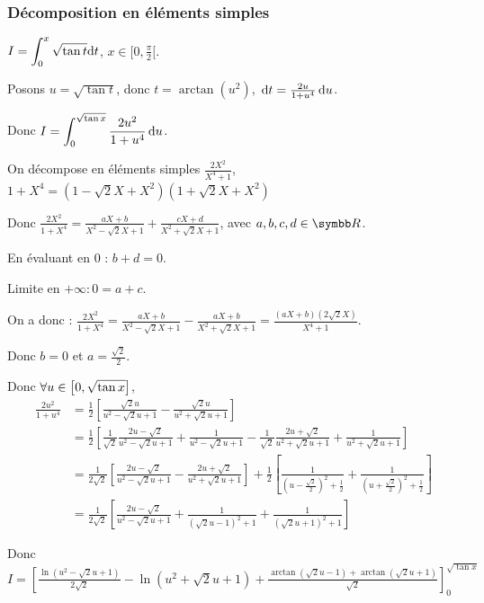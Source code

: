 \subsubsection{Décomposition en éléments simples}
\begin{exemple}
    $\displaystyle I = \int_0^x \sqrt{\tan t} \text d t$, $x \in [0, \frac \pi 2[$.

    Posons $u = \sqrt{\tan t}$, donc $t = \arctan(u^2)$, $\,\mathrm{d}t = \frac{2u}{1 + u^4} \,\mathrm{d} u$.

    Donc $\displaystyle I = \int_0^{\sqrt{\tan x}} \frac{2u^2}{1 + u^4} \,\mathrm{d} u$.

    \avspace On décompose en éléments simples $\frac{2X^2}{X^4 + 1}$,
    $1 + X^4 = (1 - \sqrt 2 X + X^2)(1 + \sqrt 2 X + X^2)$

    Donc $\displaystyle \frac{2X^2}{1 + X^4} = \frac{aX + b}{X^2 - \sqrt 2 X + 1} + \frac{cX + d}{X^2 + \sqrt 2 X + 1}$,
    avec $a,b,c,d \in \R$.

    \avspace En évaluant en 0 : $b + d = 0$.

    Limite en $+\infty : 0 = a + c$. 

   \avspace On a donc : $\displaystyle \frac{2X^2}{1 + X^4} = \frac{aX + b}{X^2 - \sqrt 2 X + 1} - \frac{aX + b}{X^2 + \sqrt 2 X + 1} = \frac{(aX + b)(2 \sqrt 2 X)}{X^4 + 1}$.

    Donc $b = 0$ et $a = \frac{\sqrt 2 }{2}$.

    Donc $\forall u \in \left[0, \sqrt{\tan x}\right]$,
    \begin{align*}
        \frac{2 u^2}{1 + u^4} & = \frac 1 2 \left[\frac{\sqrt 2 u }{u^2 - \sqrt 2 u + 1} - \frac{\sqrt 2 u }{u^2 + \sqrt 2 u + 1}\right]\\
        & = \frac 1 2 \left[ \frac 1 {\sqrt 2} \frac{2u - \sqrt 2}{u^2 - \sqrt 2 u + 1} + \frac 1 {u^2 - \sqrt 2 u + 1} - \frac 1 {\sqrt 2} \frac{2u + \sqrt 2}{u^2 + \sqrt 2 u + 1} + \frac 1 {u^2 + \sqrt 2 u + 1} \right]\\
        & = \frac 1 {2 \sqrt 2} \left[ \frac{2u - \sqrt 2}{u^2 - \sqrt 2 u + 1} - \frac{2u + \sqrt 2}{u^2 + \sqrt 2 u + 1} \right] + \frac 1 2 \left[ \frac{1}{\left( u - \frac{\sqrt 2 }{2} \right)^2 + \frac 1 2} + \frac{1}{\left( u + \frac{\sqrt 2}{2} \right)^2 + \frac 1 2} \right]\\
        & = \frac 1 {2 \sqrt 2} \left[ \frac{2u - \sqrt 2}{u^2 - \sqrt 2 u + 1} + \frac 1 {(\sqrt 2 u - 1)^2 + 1} + \frac 1 {(\sqrt 2 u + 1)^2 + 1} \right]
    \end{align*}

    Donc $\displaystyle I = \left[ \frac{\ln(u^2 - \sqrt 2 u + 1)}{2\sqrt 2} - \ln(u^2 + \sqrt 2 u + 1) + \frac{\arctan(\sqrt 2 u - 1) + \arctan(\sqrt 2 u + 1)}{\sqrt 2}\right]_0^{\sqrt{\tan x}}$
\end{exemple}

